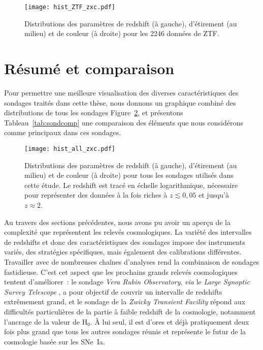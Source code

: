 \documentclass[../main/main.tex]{subfiles}
\begin{document}
\begin{figure}[]
    \centering
    \texttt{[image: hist\_ZTF\_zxc.pdf]}
    \caption[Distributions des paramètres de redshift, étirement et couleur de
    ZTF]{Distributions des paramètres de redshift (à gauche), d'étirement (au
    milieu) et de couleur (à droite) pour les 2246 données de ZTF.}
    \label{fig:ztfhist}
\end{figure}

\section{Résumé et comparaison}\label{sec:sondcomp}

Pour permettre une meilleure visualisation des diverses caractéristiques des
sondages traités dans cette thèse, nous donnons un graphique combiné des
distributions de tous les sondages Figure~\ref{fig:hist_all_zxc}, et présentons
Tableau~\ref{tab:sondcomp} une comparaison des éléments que nous considérons
comme principaux dans ces sondages.

\begin{figure}[ht!]
    \centering
    \texttt{[image: hist\_all\_zxc.pdf]}
    \caption[Distributions des paramètres de redshift, étirement et couleur de
    tous les sondages utilisés dans cette étude]{Distributions des paramètres de
        redshift (à gauche), d'étirement (au milieu) et de couleur (à droite)
        pour tous les sondages utilisés dans cette étude. Le redshift est tracé
        en échelle logarithmique, nécessaire pour représenter des données à la
        fois riches à $z \lesssim 0,05$ et jusqu'à $z \approx 2$.}
    \label{fig:hist_all_zxc}
\end{figure}

Au travers des sections précédentes, nous avons pu avoir un aperçu de la
complexité que représentent les relevés cosmologiques. La variété des
intervalles de redshifts et donc des caractéristiques des sondages impose des
instruments variés, des stratégies spécifiques, mais également des calibrations
différentes. Travailler avec de nombreuses chaînes d'analyses rend la
combinaison de sondages fastidieuse. C'est cet aspect que les prochains grands
relevés cosmologiques tentent d'améliorer~: le sondage \textit{Vera Rubin
Observatory}, \textit{via} le \textit{Large Synoptic Survey Telescope}
\citep[LSST,][]{ivezic2019}, a pour objectif de couvrir un intervalle de
redshifts extrêmement grand, et le sondage de la \textit{Zwicky Transient
Facility} répond aux difficultés particulières de la partie à faible redshift de
la cosmologie, notamment l'ancrage de la valeur de H$_0$. À lui seul, il est
d'ores et déjà pratiquement deux fois plus grand que tous les autres sondages
réunis et représente le futur de la cosmologie basée sur les SNe~Ia.
\end{document}
